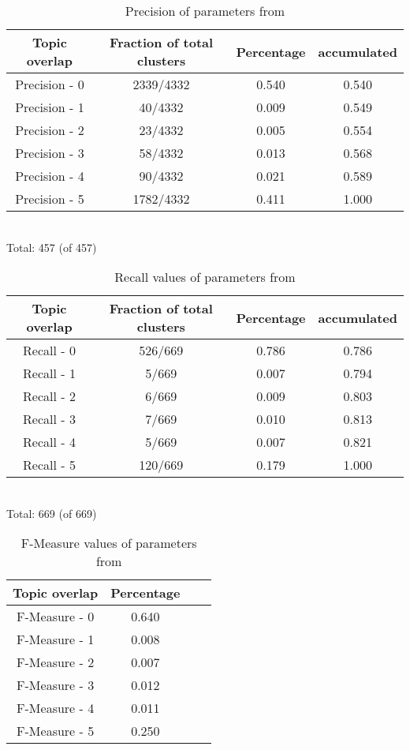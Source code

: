 \begin{table}[H]
\begin{center}
\begin{tabular}{|c|c|c|c|}
\hline
Topic overlap &  Fraction of total clusters & Percentage  & accumulated\\ 
\hline
Precision - 0&   2339/4332&   0.540&   0.540\\ 
Precision - 1&   40/4332&   0.009&   0.549\\ 
Precision - 2&   23/4332&   0.005&   0.554\\ 
Precision - 3&   58/4332&   0.013&   0.568\\ 
Precision - 4&   90/4332&   0.021&   0.589\\ 
Precision - 5&   1782/4332&   0.411&   1.000\\ 
\hline
\end{tabular}
\\Total: 457 (of  457)
\end{center}
\caption{Precision of parameters from \citeauthor{Oren1998}}
\label{tab:klimaukenparametersgroundtruth}
\end{table}


\begin{table}[H]
\begin{center}
\begin{tabular}{|c|c|c|c|}
\hline
Topic overlap &  Fraction of total clusters & Percentage  & accumulated\\ 
\hline
Recall - 0&    526/669&   0.786&   0.786\\ 
Recall - 1&     5/669&    0.007&   0.794\\ 
Recall - 2&     6/669&    0.009&   0.803\\ 
Recall - 3&     7/669&    0.010&   0.813\\ 
Recall - 4&     5/669&    0.007&   0.821\\ 
Recall - 5&    120/669&   0.179&   1.000\\ 
\hline
\end{tabular}
\\Total: 669 (of  669)
\end{center}
\caption{Recall values of parameters from \citeauthor{Oren1998}}
\label{tab:klimaukenparametersgroundtruthrep}
\end{table}

\begin{table}[H]
\begin{center}
\begin{tabular}{|c|c|c|c|}
\hline
Topic overlap & Percentage\\ 
\hline
F-Measure - 0&    0.640\\ 
F-Measure - 1&    0.008\\ 
F-Measure - 2&    0.007\\ 
F-Measure - 3&    0.012\\ 
F-Measure - 4&    0.011\\ 
F-Measure - 5&    0.250\\ 
\hline
\end{tabular}
\end{center}
\caption{F-Measure values of parameters from \citeauthor{Oren1998}}
\label{tab:klimaukenparametersfmeasure}
\end{table}

